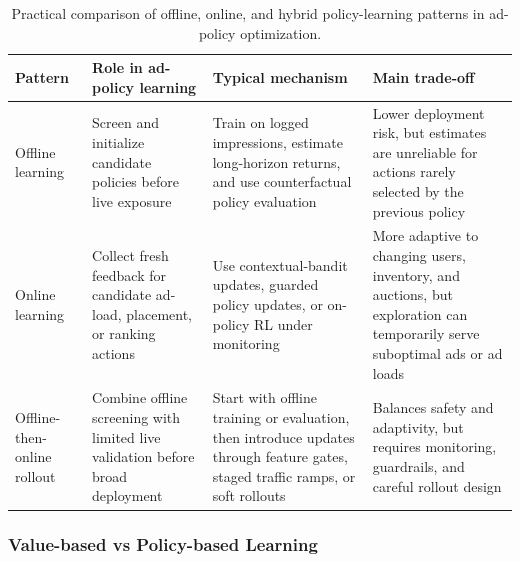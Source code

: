 \documentclass[manuscript,review,screen]{acmart}
\begin{document}
\begin{table}[ht]
\centering
\footnotesize
\renewcommand{\arraystretch}{1.15}
\setlength{\tabcolsep}{4pt}
\begin{tabularx}{\textwidth}{>{\raggedright\arraybackslash}p{} >{\raggedright\arraybackslash}X >{\raggedright\arraybackslash}X >{\raggedright\arraybackslash}X}
\toprule
\textbf{Pattern} & \textbf{Role in ad-policy learning} & \textbf{Typical mechanism} & \textbf{Main trade-off} \\
\midrule
Offline learning & Screen and initialize candidate policies before live exposure \cite{levine2020offline, chen2022off, gauci2018horizon} & Train on logged impressions, estimate long-horizon returns, and use counterfactual policy evaluation \cite{chen2022off, swaminathan2015counterfactual, dudik2011doubly} & Lower deployment risk, but estimates are unreliable for actions rarely selected by the previous policy \cite{levine2020offline, swaminathan2015counterfactual} \\
Online learning & Collect fresh feedback for candidate ad-load, placement, or ranking actions \cite{li2010contextual, bietti2021contextual, van2024practical} & Use contextual-bandit updates, guarded policy updates, or on-policy RL under monitoring \cite{Mehrotra2020, gauci2018horizon, xu2023optimizing} & More adaptive to changing users, inventory, and auctions, but exploration can temporarily serve suboptimal ads or ad loads \cite{dulac2021challenges} \\
Offline-then-online rollout & Combine offline screening with limited live validation before broad deployment \cite{chen2022off, gauci2018horizon, Mehrotra2020} & Start with offline training or evaluation, then introduce updates through feature gates, staged traffic ramps, or soft rollouts \cite{gauci2018horizon, chen2022off} & Balances safety and adaptivity, but requires monitoring, guardrails, and careful rollout design \cite{dulac2021challenges, gauci2018horizon} \\
\bottomrule
\end{tabularx}
\caption{Practical comparison of offline, online, and hybrid policy-learning patterns in ad-policy optimization.}
\label{tab:offline-online-policy-learning}
\end{table}

\subsubsection{Value-based vs Policy-based Learning}
\end{document}
